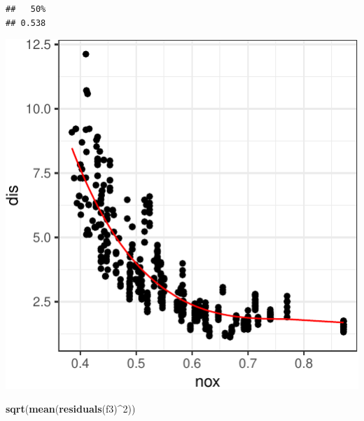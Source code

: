 \documentclass[]{article}
\newenvironment{Shaded}{\begin{snugshade}}{\end{snugshade}}
\newcommand{\DataTypeTok}[1]{\textcolor[rgb]{0.13,0.29,0.53}{#1}}
\newcommand{\DecValTok}[1]{\textcolor[rgb]{0.00,0.00,0.81}{#1}}
\newcommand{\KeywordTok}[1]{\textcolor[rgb]{0.13,0.29,0.53}{\textbf{#1}}}
\newcommand{\NormalTok}[1]{#1}
\newcommand{\OperatorTok}[1]{\textcolor[rgb]{0.81,0.36,0.00}{\textbf{#1}}}
\newcommand{\StringTok}[1]{\textcolor[rgb]{0.31,0.60,0.02}{#1}}
\begin{document}
\begin{verbatim}
##   50% 
## 0.538
\end{verbatim}

\begin{Shaded}
\end{Shaded}

\begin{center}\includegraphics{sol_A4_files/figure-latex/unnamed-chunk-4-1} \end{center}

\begin{Shaded}
\begin{Highlighting}[]
\KeywordTok{sqrt}\NormalTok{(}\KeywordTok{mean}\NormalTok{(}\KeywordTok{residuals}\NormalTok{(f3)}\OperatorTok{^}\DecValTok{2}\NormalTok{))}
\end{Highlighting}
\end{Shaded}
\end{document}
